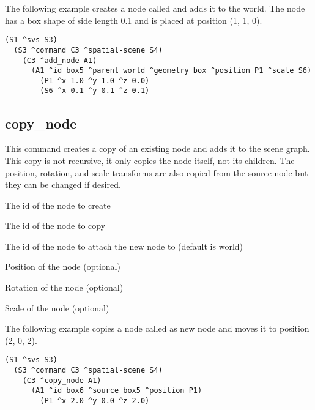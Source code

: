 The following example creates a node called  and adds it to the world.
The node has a box shape of side length 0.1 and is placed at position (1, 1, 0).

\begin{verbatim}
(S1 ^svs S3)
  (S3 ^command C3 ^spatial-scene S4)
    (C3 ^add_node A1)
      (A1 ^id box5 ^parent world ^geometry box ^position P1 ^scale S6)
        (P1 ^x 1.0 ^y 1.0 ^z 0.0)
        (S6 ^x 0.1 ^y 0.1 ^z 0.1)
\end{verbatim}


\subsection{copy\_node}

This command creates a copy of an existing node and adds it to the scene graph.
This copy is not recursive, it only copies the node itself, not its children.
The position, rotation, and scale transforms are also copied from the source node
but they can be changed if desired.

\begin{description}
	\item{} The id of the node to create
	\item{} The id of the node to copy
	\item{} The id of the node to attach the new node to (default is world)
	\item{} Position of the node (optional)
	\item{} Rotation of the node (optional)
	\item{} Scale of the node (optional)
\end{description}

The following example copies a node called  as new node 
and moves it to position (2, 0, 2).

\begin{verbatim}
(S1 ^svs S3)
  (S3 ^command C3 ^spatial-scene S4)
    (C3 ^copy_node A1)
      (A1 ^id box6 ^source box5 ^position P1)
        (P1 ^x 2.0 ^y 0.0 ^z 2.0)
\end{verbatim}


